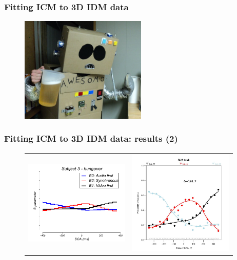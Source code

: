 \documentclass[xcolor={fixpdftex,hyperref,x11names},10pt,pdftex,hyperref={pdftex}]{beamer}
\begin{document}
\begin{frame}
  \frametitle{Fitting ICM to 3D IDM data}
   \begin{figure}[h]
    \includegraphics[width=60mm,totalheight=0.65\textheight]{figs/funny-drunk-guy-robot.jpg}
    \end{figure}
\end{frame}


\begin{frame}
  \frametitle{Fitting ICM to 3D IDM data: results (2)}
   \begin{figure}[h]
      \begin{tabular}{c c}
      \includegraphics[width=50mm,totalheight=0.5\textheight]{figs/sub3_plot_Bs}
      &
      \includegraphics[width=50mm,totalheight=0.5\textheight]{figs/sub3_fitted_model.jpg}
       \end{tabular}
   \end{figure}
\end{frame}  
\end{document}
